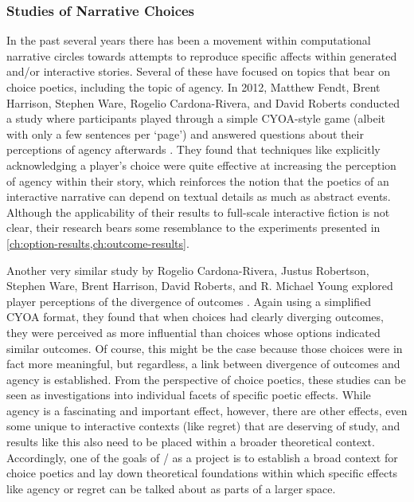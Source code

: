 


\subsubsection{Studies of Narrative Choices}

In the past several years there has been a movement within computational narrative circles towards attempts to reproduce specific affects within generated and/or interactive stories.
%
Several of these have focused on topics that bear on choice poetics, including the topic of agency.
%
In 2012, Matthew Fendt, Brent Harrison, Stephen Ware, Rogelio Cardona-Rivera, and David Roberts conducted a study where participants played through a simple CYOA-style game (albeit with only a few sentences per `page') and answered questions about their perceptions of agency afterwards \citep{Fendt2012}.
%
They found that techniques like explicitly acknowledging a player's choice were quite effective at increasing the perception of agency within their story, which reinforces the notion that the poetics of an interactive narrative can depend on textual details as much as abstract events.
%
Although the applicability of their results to full-scale interactive fiction is not clear, their research bears some resemblance to the experiments presented in \cref{ch:option-results,ch:outcome-results}.


Another very similar study by Rogelio Cardona-Rivera, Justus Robertson, Stephen Ware, Brent Harrison, David Roberts, and R. Michael Young explored player perceptions of the divergence of outcomes \citep{Cardona-Rivera2014}.
%
Again using a simplified CYOA format, they found that when choices had clearly diverging outcomes, they were perceived as more influential than choices whose options indicated similar outcomes.
%
Of course, this might be the case because those choices were in fact more meaningful, but regardless, a link between divergence of outcomes and agency is established.
%
From the perspective of choice poetics, these studies can be seen as investigations into individual facets of specific poetic effects.
%
While agency is a fascinating and important effect, however, there are other effects, even some unique to interactive contexts (like regret) that are deserving of study, and results like this also need to be placed within a broader theoretical context.
%
Accordingly, one of the goals of \dunyazad/ as a project is to establish a broad context for choice poetics and lay down theoretical foundations within which specific effects like agency or regret can be talked about as parts of a larger space.


